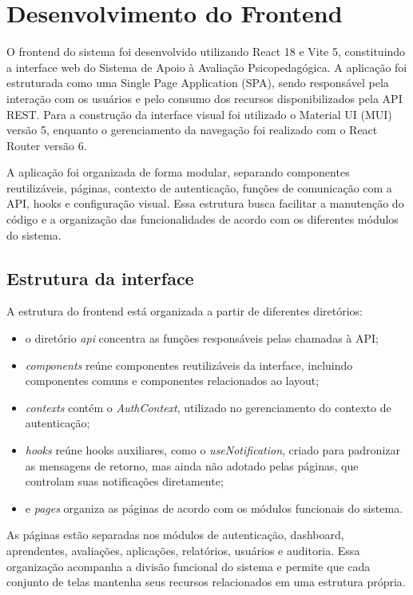 \chapter[Desenvolvimento do Frontend]{Desenvolvimento do Frontend} \label{capitulo9}

O frontend do sistema foi desenvolvido utilizando React 18 e Vite 5, constituindo a interface web do Sistema de Apoio à Avaliação Psicopedagógica. A aplicação foi estruturada como uma Single Page Application (SPA), sendo responsável pela interação com os usuários e pelo consumo dos recursos disponibilizados pela API REST. Para a construção da interface visual foi utilizado o Material UI (MUI) versão 5, enquanto o gerenciamento da navegação foi realizado com o React Router versão 6.

A aplicação foi organizada de forma modular, separando componentes reutilizáveis, páginas, contexto de autenticação, funções de comunicação com a API, hooks e configuração visual. Essa estrutura busca facilitar a manutenção do código e a organização das funcionalidades de acordo com os diferentes módulos do sistema.

\section{Estrutura da interface}

A estrutura do frontend está organizada a partir de diferentes diretórios: 

\begin{itemize}
    \item o diretório \textit{api} concentra as funções responsáveis pelas chamadas à API; 
    \item \textit{components} reúne componentes reutilizáveis da interface, incluindo componentes comuns e componentes relacionados ao layout; 
    \item \textit{contexts} contém o \textit{AuthContext}, utilizado no gerenciamento do contexto de autenticação; 
    \item \textit{hooks} reúne hooks auxiliares, como o \textit{useNotification}, criado para padronizar as mensagens de retorno, mas ainda não adotado pelas páginas, que controlam suas notificações diretamente;
    \item e \textit{pages} organiza as páginas de acordo com os módulos funcionais do sistema.
\end{itemize}

As páginas estão separadas nos módulos de autenticação, dashboard, aprendentes, avaliações, aplicações, relatórios, usuários e auditoria. Essa organização acompanha a divisão funcional do sistema e permite que cada conjunto de telas mantenha seus recursos relacionados em uma estrutura própria.


